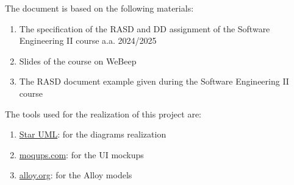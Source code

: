 \documentclass[11pt,twoside]{article}
\begin{document}
\setcounter{page}{2}

\newpage
{}
\tableofcontents
\newpage
{}
\listoffigures
{}
\listoftables

\clearpage
{}
\label{sect:Introduction}


\clearpage
{}
\label{sect:Model Architectural Design}



\clearpage
{}
\label{sect:Solutions}


\clearpage
{}
\label{sect:effort}


\clearpage
{}


The document is based on the following materials:
\begin{enumerate}
    \item The specification of the RASD and DD assignment of the Software Engineering II
course a.a. 2024/2025
    \item Slides of the course on WeBeep
    \item The RASD document example given during the Software Engineering II
course
\end{enumerate}
The tools used for the realization of this project are:
\begin{enumerate}
    \item \hyperlink{https://staruml.io/}{Star UML}: for the diagrams realization
    \item  \hyperlink{https://moqups.com/it/}{moqups.com}: for the UI mockups
    \item \hyperlink{https://alloytools.org/}{alloy.org}: for the Alloy models
\end{enumerate}
\end{document}
